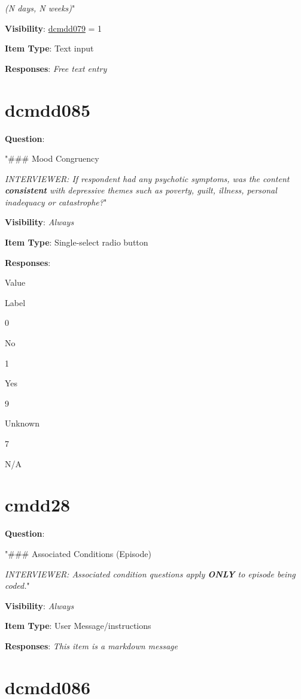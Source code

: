 \documentclass[
]{book}
\begin{document}
\emph{(N days, N weeks)}"

\textbf{Visibility}: \protect\hyperlink{dcmdd079}{dcmdd079} = 1

\textbf{Item Type}: Text input

\textbf{Responses}: \emph{Free text entry}

\hypertarget{dcmdd085}{%
\section{dcmdd085}\label{dcmdd085}}

\textbf{Question}:

"\#\#\# Mood Congruency

\emph{INTERVIEWER: If respondent had any psychotic symptoms, was the content \textbf{consistent} with depressive themes such as poverty, guilt, illness, personal inadequacy or catastrophe?}"

\textbf{Visibility}: \emph{Always}

\textbf{Item Type}: Single-select radio button

\textbf{Responses}:

Value

Label

0

No

1

Yes

9

Unknown

7

N/A

\hypertarget{cmdd28}{%
\section{cmdd28}\label{cmdd28}}

\textbf{Question}:

"\#\#\# Associated Conditions (Episode)

\emph{INTERVIEWER: Associated condition questions apply \textbf{ONLY} to episode being coded.}"

\textbf{Visibility}: \emph{Always}

\textbf{Item Type}: User Message/instructions

\textbf{Responses}: \emph{This item is a markdown message}

\hypertarget{dcmdd086}{%
\section{dcmdd086}\label{dcmdd086}}
\end{document}

